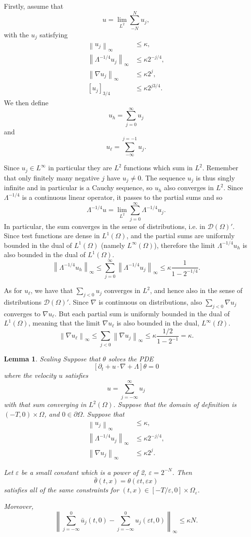 \documentclass[11pt]{amsart}
\newtheorem{lemma}[theorem]{Lemma}
\theoremstyle{remark}
\newcommand{\eps}{\varepsilon}
\newcommand{\norm}[1]{\left\lVert#1\right\rVert}
\newcommand{\bracket}[1]{\left[ #1 \right]}
\newcommand{\del}{\partial}
\newcommand{\grad}{\nabla}
\newcommand{\test}{\mathcal{D}}
\begin{document}
Firstly, assume that 
\[ u = \lim_{L^2} \sum_{-N}^N u_j, \]
with the $u_j$ satisfying
\begin{align*} 
\norm{u_j}_\infty &\leq \kappa, \\
\norm{\Lambda^{-1/4} u_j}_\infty &\leq \kappa 2^{-j/4}, \\
\norm{\grad u_j}_\infty &\leq \kappa 2^j, \\
\bracket{u_j}_{3/4} &\leq \kappa 2^{j 3/4}. 
\end{align*}
We then define
\[ u_h = \sum_{j=0}^\infty u_j \]
and 
\[ u_\ell = \sum_{-\infty}^{j=-1} u_j. \]

Since $u_j \in L^\infty$ in particular they are $L^2$ functions which sum in $L^2$.  Remember that only finitely many negative $j$ have $u_j \neq 0$.  The sequence $u_j$ is thus singly infinite and in particular is a Cauchy sequence, so $u_h$ also converges in $L^2$.  Since $\Lambda^{-1/4}$ is a continuous linear operator, it passes to the partial sums and so
\[ \Lambda^{-1/4} u = \lim_{L^2} \sum_{j=0}^\infty \Lambda^{-1/4} u_j. \]
In particular, the sum converges in the sense of distributions, i.e. in $\test(\Omega)'$.  Since test functions are dense in $L^1(\Omega)$, and the partial sums are uniformly bounded in the dual of $L^1(\Omega)$ (namely $L^\infty(\Omega)$), therefore the limit $\Lambda^{-1/4} u_h$ is also bounded in the dual of $L^1(\Omega)$.  
\[ \norm{\Lambda^{-1/4} u_h}_\infty \leq \sum_{j=0}^\infty \norm{\Lambda^{-1/4} u_j}_\infty \leq \kappa \frac{1}{1-2^{-1/4}}. \]

As for $u_\ell$, we have that $\sum_{j < 0} u_j$ converges in $L^2$, and hence also in the sense of distributions $\test(\Omega)'$.  Since $\grad$ is continuous on distributions, also $\sum_{j<0} \grad u_j$ converges to $\grad u_\ell$.  But each partial sum is uniformly bounded in the dual of $L^1(\Omega)$, meaning that the limit $\grad u_\ell$ is also bounded in the dual, $L^\infty(\Omega)$.  
\[ \norm{\grad u_\ell}_\infty \leq \sum_{j < 0} \norm{\grad u_j}_\infty \leq \kappa \frac{1/2}{1 - 2^{-1}} = \kappa. \]

\begin{lemma}{Scaling}
Suppose that $\theta$ solves the PDE
\[ \bracket{\del_t + u\cdot\grad + \Lambda} \theta = 0\]
where the velocity $u$ satisfies
\[ u = \sum_{j=-\infty}^\infty u_j \]
with that sum converging in $L^2(\Omega)$.  Suppose that the domain of definition is $(-T,0) \times \Omega$, and $0 \in \del \Omega$.  Suppose that
\begin{align*}
\norm{u_j}_\infty &\leq \kappa, \\
\norm{\Lambda^{-1/4} u_j}_\infty &\leq \kappa 2^{-j/4}, \\
\norm{\grad u_j}_\infty &\leq \kappa 2^j.
\end{align*}

Let $\eps$ be a small constant which is a power of 2, $\eps = 2^{-N}$. Then
\[ \bar{\theta}(t,x) = \theta(\eps t, \eps x) \]
satisfies all of the same constraints for $(t,x) \in [-T/\eps, 0]\times \Omega_\eps$.  

Moreover, 
\[ \norm{\sum_{j=-\infty}^0 \bar{u}_j(t,0) - \sum_{j=-\infty}^0 u_j(\eps t, 0)}_\infty \leq \kappa N. \]
\end{lemma}
\end{document}
